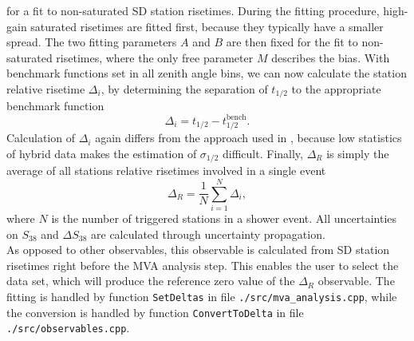 \documentclass[12pt,a4paper]{report}
\begin{document}
for a fit to non-saturated SD station risetimes. During the fitting procedure, high-gain saturated risetimes are fitted first, because they typically have a smaller spread. The two fitting parameters $A$ and $B$ are then fixed for the fit to non-saturated risetimes, where the only free parameter $M$ describes the bias. With benchmark functions set in all zenith angle bins, we can now calculate the station relative risetime $\Delta_i$, by determining the separation of $t_{1/2}$ to the appropriate benchmark function
\begin{equation}
\Delta_i = t_{1/2} - t_{1/2}^{\textrm{bench}}.
\end{equation}
Calculation of $\Delta_i$ again differs from the approach used in \cite{deltaMethod}, because low statistics of hybrid data makes the estimation of $\sigma_{1/2}$ difficult. Finally, $\Delta_R$ is simply the average of all stations relative risetimes involved in a single event
\begin{equation}
\Delta_R = \frac{1}{N} \displaystyle\sum_{i = 1}^{N} \Delta_i,
\end{equation}
where $N$ is the number of triggered stations in a shower event. All uncertainties on $S_{38}$ and $\Delta S_{38}$ are calculated through uncertainty propagation.\\
As opposed to other observables, this observable is calculated from SD station risetimes right before the MVA analysis step. This enables the user to select the data set, which will produce the reference zero value of the $\Delta_R$ observable. The fitting is handled by function \texttt{SetDeltas} in file \texttt{./src/mva\_analysis.cpp}, while the conversion is handled by function \texttt{ConvertToDelta} in file \texttt{./src/observables.cpp}.
\end{document}
